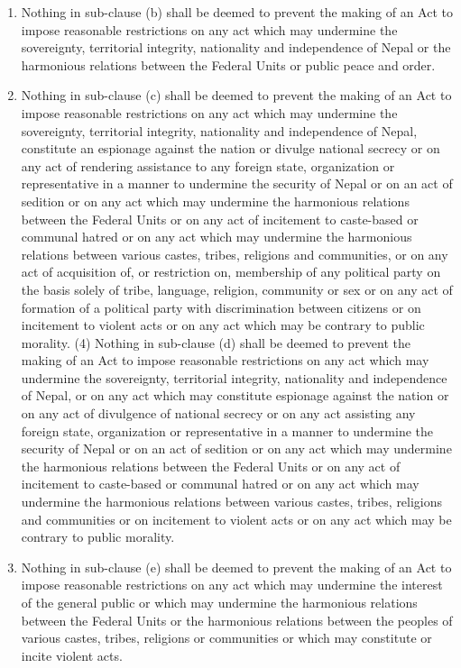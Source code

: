 \begin{questions}
\begin{solution}
\begin{enumerate}
\begin{enumerate}
          \item Nothing in sub-clause (b) shall be deemed to prevent the making of an Act to impose reasonable restrictions on any act which may undermine the sovereignty, territorial integrity, nationality and independence of Nepal or the harmonious relations between the Federal Units or public peace and order.
          \item Nothing in sub-clause (c) shall be deemed to prevent the making of an Act to impose reasonable restrictions on any act which may undermine the sovereignty, territorial integrity, nationality and independence of Nepal, constitute an espionage against the nation or divulge national secrecy or on any act of rendering assistance to any foreign state, organization or representative in a manner to undermine the security of Nepal or on an act of sedition or on any act which may undermine the harmonious relations between the Federal Units or on any act of incitement to caste-based or communal hatred or on any act which may undermine the harmonious relations between various castes, tribes, religions and communities, or on any act of acquisition of, or restriction on, membership of any political party on the basis solely of tribe, language, religion, community or sex or on any act of formation of a political party with discrimination between citizens or on incitement to violent acts or on any act which may be contrary to public morality. (4) Nothing in sub-clause (d) shall be deemed to prevent the making of an Act to impose reasonable restrictions on any act which may undermine the sovereignty, territorial integrity, nationality and independence of Nepal, or on any act which may constitute espionage against the nation or on any act of divulgence of national secrecy or on any act assisting any foreign state, organization or representative in a manner to undermine the security of Nepal or on an act of sedition or on any act which may undermine the harmonious relations between the Federal Units or on any act of incitement to caste-based or communal hatred or on any act which may undermine the harmonious relations between various castes, tribes, religions and communities or on incitement to violent acts or on any act which may be contrary to public morality.
          \item Nothing in sub-clause (e) shall be deemed to prevent the making of an Act to impose reasonable restrictions on any act which may undermine the interest of the general public or which may undermine the harmonious relations between the Federal Units or the harmonious relations between the peoples of various castes, tribes, religions or communities or which may constitute or incite violent acts.

\end{enumerate}
\end{enumerate}
\end{solution}
\end{questions}

